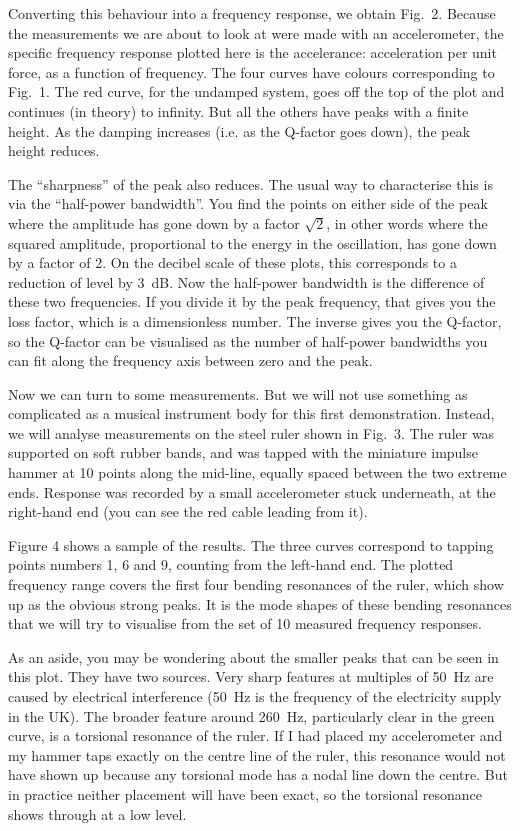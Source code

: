   Converting this behaviour into a frequency response, we obtain Fig.\ 2. 
  Because the measurements we are about to look at were made with an 
  accelerometer, the specific frequency response plotted here is the 
  accelerance: acceleration per unit force, as a function of frequency. The 
  four curves have colours corresponding to Fig.\ 1. The red curve, for the 
  undamped system, goes off the top of the plot and continues (in theory) to 
  infinity. But all the others have peaks with a finite height. As the damping 
  increases (i.e. as the Q-factor goes down), the peak height reduces. 

  The “sharpness” of the peak also reduces. The usual way to characterise this 
  is via the “half-power bandwidth”. You find the points on either side of the 
  peak where the amplitude has gone down by a factor $\sqrt{2}$, in other words 
  where the squared amplitude, proportional to the energy in the oscillation, 
  has gone down by a factor of 2. On the decibel scale of these plots, this 
  corresponds to a reduction of level by 3~dB. Now the half-power bandwidth is 
  the difference of these two frequencies. If you divide it by the peak 
  frequency, that gives you the loss factor, which is a dimensionless number. 
  The inverse gives you the Q-factor, so the Q-factor can be visualised as the 
  number of half-power bandwidths you can fit along the frequency axis between 
  zero and the peak. 

  Now we can turn to some measurements. But we will not use something as 
  complicated as a musical instrument body for this first demonstration. 
  Instead, we will analyse measurements on the steel ruler shown in Fig.\ 3. 
  The ruler was supported on soft rubber bands, and was tapped with the 
  miniature impulse hammer at 10 points along the mid-line, equally spaced 
  between the two extreme ends. Response was recorded by a small accelerometer 
  stuck underneath, at the right-hand end (you can see the red cable leading 
  from it). 

  Figure 4 shows a sample of the results. The three curves correspond to 
  tapping points numbers 1, 6 and 9, counting from the left-hand end. The 
  plotted frequency range covers the first four bending resonances of the 
  ruler, which show up as the obvious strong peaks. It is the mode shapes of 
  these bending resonances that we will try to visualise from the set of 10 
  measured frequency responses. 

  As an aside, you may be wondering about the smaller peaks that can be seen in 
  this plot. They have two sources. Very sharp features at multiples of 50~Hz 
  are caused by electrical interference (50~Hz is the frequency of the 
  electricity supply in the UK). The broader feature around 260~Hz, 
  particularly clear in the green curve, is a torsional resonance of the ruler. 
  If I had placed my accelerometer and my hammer taps exactly on the centre 
  line of the ruler, this resonance would not have shown up because any 
  torsional mode has a nodal line down the centre. But in practice neither 
  placement will have been exact, so the torsional resonance shows through at a 
  low level. 

